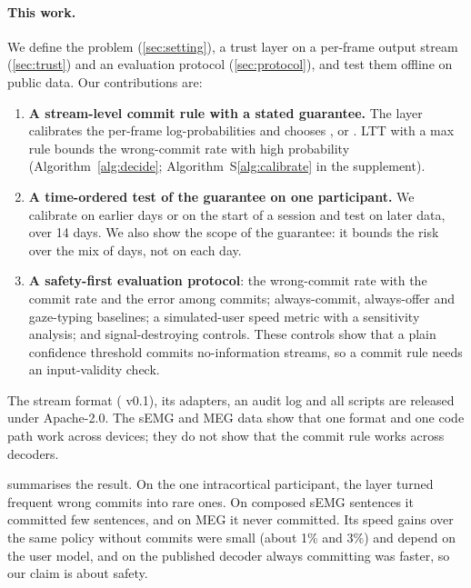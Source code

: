 \paragraph{This work.} We define the problem (\cref{sec:setting}), a trust layer on a per-frame output stream (\cref{sec:trust}) and an evaluation protocol (\cref{sec:protocol}), and test them offline on public data. Our contributions are:
\begin{enumerate}[leftmargin=*,itemsep=1pt]
  \item \textbf{A stream-level commit rule with a stated guarantee.} The layer calibrates the per-frame log-probabilities and chooses ,  or . LTT with a max rule bounds the wrong-commit rate with high probability (Algorithm~\ref{alg:decide}; Algorithm~S\ref{alg:calibrate} in the supplement).
  \item \textbf{A time-ordered test of the guarantee on one participant.} We calibrate on earlier days or on the start of a session and test on later data, over 14 days. We also show the scope of the guarantee: it bounds the risk over the mix of days, not on each day.
  \item \textbf{A safety-first evaluation protocol}: the wrong-commit rate with the commit rate and the error among commits; always-commit, always-offer and gaze-typing baselines; a simulated-user speed metric with a sensitivity analysis; and signal-destroying controls. These controls show that a plain confidence threshold commits no-information streams, so a commit rule needs an input-validity check.
\end{enumerate}
The stream format (\nts{} v0.1), its adapters, an audit log and all scripts are released under Apache-2.0. The sEMG and MEG data show that one format and one code path work across devices; they do not show that the commit rule works across decoders.

 summarises the result. On the one intracortical participant, the layer turned frequent wrong commits into rare ones. On composed sEMG sentences it committed few sentences, and on MEG it never committed. Its speed gains over the same policy without commits were small (about 1\% and 3\%) and depend on the user model, and on the published decoder always committing was faster, so our claim is about safety.

